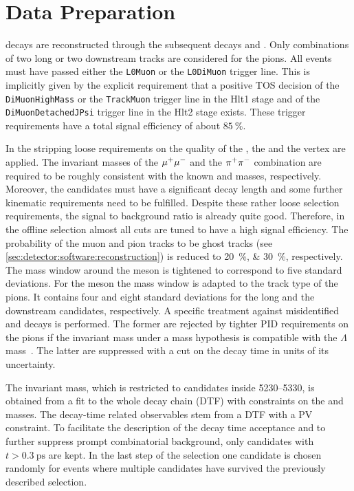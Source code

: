 
\section{Data Preparation}
\label{sec:bd2jpsiks:datapreparation}


\BdToJPsiKS decays are reconstructed through the subsequent decays
\mbox{\JPsiToMuMu} and \KSToPiPi. Only combinations of two long or two
downstream tracks are considered for the pions. All events must have passed
either the \texttt{L0Muon} or the \texttt{L0DiMuon} trigger line. This is
implicitly given by the explicit requirement that a positive \jpsi TOS
decision of the \texttt{DiMuonHighMass} or the \texttt{TrackMuon} trigger line
in the Hlt1 stage and of the \texttt{DiMuonDetachedJPsi} trigger line in the
Hlt2 stage exists. These trigger requirements have a total signal efficiency
of about $\SI{85}{\percent}$.

In the stripping loose requirements on the quality of the \jpsi, the \KS and
the \Bd vertex are applied. The invariant masses of the ${\mu^+\mu^-}$ and the
${{\pi}^+}{{\pi}^-}$ combination are required to be roughly consistent with the known
\jpsi and \KS masses, respectively. Moreover, the \KS candidates must have a
significant decay length and some further kinematic requirements need to be
fulfilled. Despite these rather loose selection requirements, the signal to
background ratio is already quite good. Therefore, in the offline selection
almost all cuts are tuned to have a high signal efficiency. The probability of
the muon and pion tracks to be ghost tracks (see
\cref{sec:detector:software:reconstruction}) is reduced to
\SIlist{20;30}{\percent}, respectively. The mass window around the \jpsi meson
is tightened to correspond to five standard deviations. For the \KS meson the
mass window is adapted to the track type of the pions. It contains four and
eight standard deviations for the long and the downstream candidates,
respectively. A specific treatment against misidentified \LbToJPsiL and
\BdToJPsiKstar decays is performed. The former are rejected by tighter PID
requirements on the pions if the invariant mass under a \pion\proton mass
hypothesis is compatible with the $\Lambda$ mass~\cite{PDG2014}. The latter
are suppressed with a cut on the \KS decay time in units of its uncertainty.

The invariant \Bd mass, which is restricted to candidates inside
\SIrange{5230}{5330}{\MeVcc}, is obtained from a fit to the whole decay chain
(DTF) with constraints on the \jpsi and \KS masses. The decay-time related
observables stem from a DTF with a PV constraint. To facilitate the
description of the decay time acceptance and to further suppress prompt
combinatorial background, only candidates with $t > \SI{0.3}{\ps}$ are kept.
In the last step of the selection one candidate is chosen randomly for events
where multiple candidates have survived the previously described selection.
